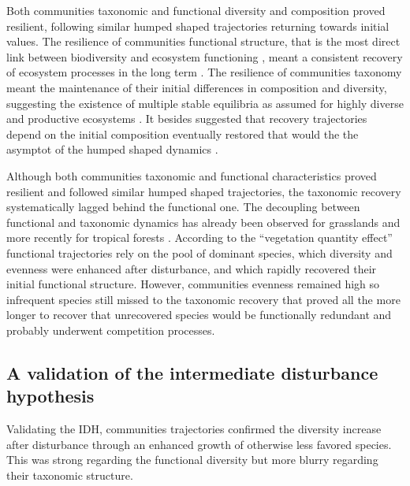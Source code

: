 \documentclass[fleqn,10pt]{ArtEcoFoG} %
\theoremstyle{definition}
\theoremstyle{definition}
\theoremstyle{definition}
\theoremstyle{remark}
\begin{document}
Both communities taxonomic and functional diversity and composition
proved resilient, following similar humped shaped trajectories returning
towards initial values. The resilience of communities functional
structure, that is the most direct link between biodiversity and
ecosystem functioning \citep{Diaz2005}, meant a consistent recovery of
ecosystem processes in the long term \citep{Guariguata2001}. The
resilience of communities taxonomy meant the maintenance of their
initial differences in composition and diversity, suggesting the
existence of multiple stable equilibria as assumed for highly diverse
and productive ecosystems \citep{Chase2003}. It besides suggested that
recovery trajectories depend on the initial composition eventually
restored that would the the asymptot of the humped shaped dynamics
\citep{Hubbell1999, Molino2001, Anderson2007, Baraloto2012a}.

Although both communities taxonomic and functional characteristics
proved resilient and followed similar humped shaped trajectories, the
taxonomic recovery systematically lagged behind the functional one. The
decoupling between functional and taxonomic dynamics has already been
observed for grasslands \citep{Tilman1997, Mouillot2011} and more
recently for tropical forests \citep{Lohbeck2015, Guariguata2001}.
According to the ``vegetation quantity effect'' \citep{Grime1998}
functional trajectories rely on the pool of dominant species, which
diversity and evenness were enhanced after disturbance, and which
rapidly recovered their initial functional structure. However,
communities evenness remained high so infrequent species still missed to
the taxonomic recovery that proved all the more longer to recover that
unrecovered species would be functionally redundant and probably
underwent competition processes.

\subsection{A validation of the intermediate disturbance
hypothesis}\label{a-validation-of-the-intermediate-disturbance-hypothesis}

Validating the IDH, communities trajectories confirmed the diversity
increase after disturbance through an enhanced growth of otherwise less
favored species. This was strong regarding the functional diversity but
more blurry regarding their taxonomic structure.
\end{document}
